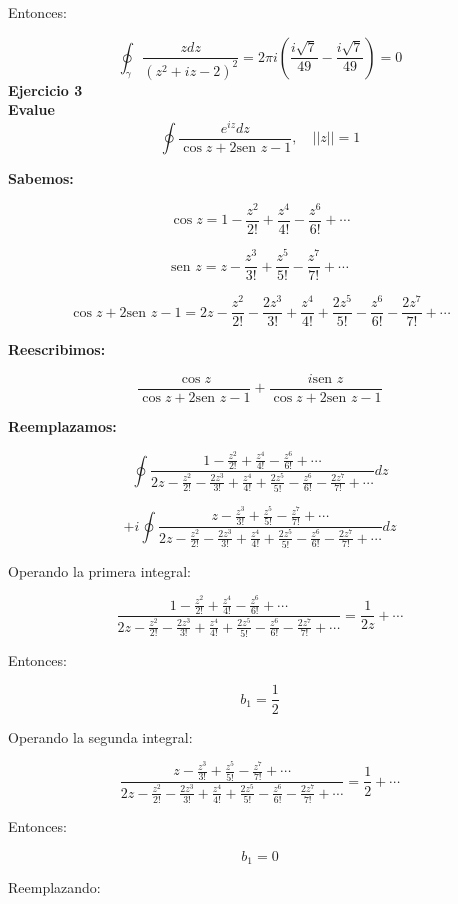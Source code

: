 \documentclass[a4paper,12pt]{article}
\begin{document}
Entonces:

\[
\oint_{\gamma} \frac{zdz}{(z^2 + iz - 2)^2} = 2\pi i (\frac{i\sqrt{7}}{49} - \frac{i\sqrt{7}}{49}) = 0
\]
\newline
\textbf{Ejercicio 3}\\
\newline
\textbf{Evalue}
\[
\oint \frac{e^{iz} dz}{\cos z + 2\text{sen } z - 1}, \quad ||z|| = 1
\]

\textbf{Sabemos:}

\[
\cos z = 1 - \frac{z^2}{2!} + \frac{z^4}{4!} - \frac{z^6}{6!} + \cdots
\]

\[
\text{sen } z = z - \frac{z^3}{3!} + \frac{z^5}{5!} - \frac{z^7}{7!} + \cdots
\]

\[
\cos z + 2\text{sen } z - 1 = 2z - \frac{z^2}{2!} - \frac{2z^3}{3!} + \frac{z^4}{4!} + \frac{2z^5}{5!} - \frac{z^6}{6!} - \frac{2z^7}{7!} + \cdots
\]

\textbf{Reescribimos:}

\[
\frac{\cos z}{\cos z + 2\text{sen } z - 1} + \frac{i\text{sen } z}{\cos z + 2\text{sen } z - 1}
\]

\textbf{Reemplazamos:}

\[
\oint \frac{1 - \frac{z^2}{2!} + \frac{z^4}{4!} - \frac{z^6}{6!} + \cdots}{2z - \frac{z^2}{2!} - \frac{2z^3}{3!} + \frac{z^4}{4!} + \frac{2z^5}{5!} - \frac{z^6}{6!} - \frac{2z^7}{7!} + \cdots} dz
\]

\[
+ i\oint \frac{z - \frac{z^3}{3!} + \frac{z^5}{5!} - \frac{z^7}{7!} + \cdots}{2z - \frac{z^2}{2!} - \frac{2z^3}{3!} + \frac{z^4}{4!} + \frac{2z^5}{5!} - \frac{z^6}{6!} - \frac{2z^7}{7!} + \cdots} dz
\]

Operando la primera integral:

\[
\frac{1 - \frac{z^2}{2!} + \frac{z^4}{4!} - \frac{z^6}{6!} + \cdots}{2z - \frac{z^2}{2!} - \frac{2z^3}{3!} + \frac{z^4}{4!} + \frac{2z^5}{5!} - \frac{z^6}{6!} - \frac{2z^7}{7!} + \cdots}=\frac{1}{2z} + \cdots
\]

Entonces:

\[
b_1 = \frac{1}{2}
\]

Operando la segunda integral:

\[
\frac{z - \frac{z^3}{3!} + \frac{z^5}{5!} - \frac{z^7}{7!} + \cdots 
}{2z - \frac{z^2}{2!} - \frac{2z^3}{3!} + \frac{z^4}{4!} + \frac{2z^5}{5!} - \frac{z^6}{6!} - \frac{2z^7}{7!} + \cdots}=\frac{1}{2} + \cdots
\]

Entonces:

\[
b_1 = 0
\]

Reemplazando:
\end{document}
